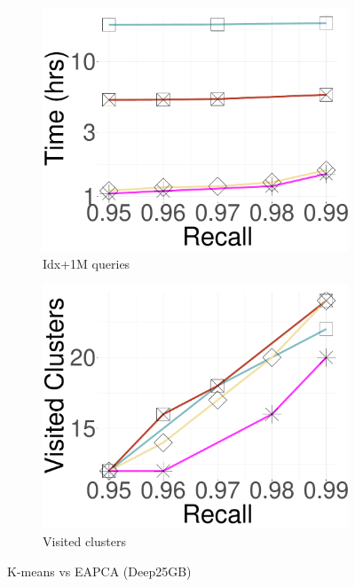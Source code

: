 \begin{figure}[tb]
	\begin{subfigure}{\sfig\columnwidth}
		\captionsetup{justification=centering}
		\centering
		\includegraphics[width=\columnwidth]{../img/elpis/ElpisvsKmeans/idxqrs.pdf}                                             \caption{Idx+1M queries} 
		\label{fig:elpis_kmeans:idxproc}
	\end{subfigure}
  \hspace{0.4cm}
	\begin{subfigure}{\sfig\columnwidth}
		\captionsetup{justification=centering}
		\centering
		\includegraphics[width=\columnwidth]{../img/elpis/ElpisvsKmeans/qrsnprobes.pdf}                                                             
		\caption{Visited clusters} 
		\label{fig:elpis_kmeans:clusters}
	\end{subfigure}	
	\vspace*{-0.2cm}
	\caption{K-means vs EAPCA (Deep25GB)  } 
	\label{fig:elpis_kmeans}
\end{figure}


